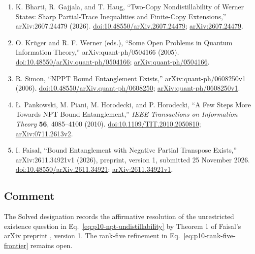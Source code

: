 \begin{enumerate}[label={},leftmargin=4.8em,labelsep=0.5em]
  \item[\textup{[BGH26]}]\label{ref:p10-bharti-et-al}
  K. Bharti, R. Gajjala, and T. Haug,
  ``Two-Copy Nondistillability of Werner States: Sharp Partial-Trace
  Inequalities and Finite-Copy Extensions,'' arXiv:2607.24479 (2026).
  \href{https://doi.org/10.48550/arXiv.2607.24479}{doi:10.48550/arXiv.2607.24479};
  \href{https://arxiv.org/abs/2607.24479}{arXiv:2607.24479}.

  \item[\textup{[KW05]}]\label{ref:p10-krueger-werner}
  O. Kr\"uger and R. F. Werner (eds.),
  ``Some Open Problems in Quantum Information Theory,''
  arXiv:quant-ph/0504166 (2005).
  \href{https://doi.org/10.48550/arXiv.quant-ph/0504166}{doi:10.48550/arXiv.quant-ph/0504166};
  \href{https://arxiv.org/abs/quant-ph/0504166}{arXiv:quant-ph/0504166}.

  \item[\textup{[Sim06]}]\label{ref:p10-simon}
  R. Simon,
  “NPPT Bound Entanglement Exists,” arXiv:quant-ph/0608250v1 (2006).
  \href{https://doi.org/10.48550/arXiv.quant-ph/0608250}{doi:10.48550/arXiv.quant-ph/0608250};
  \href{https://arxiv.org/abs/quant-ph/0608250v1}{arXiv:quant-ph/0608250v1}.

  \item[\textup{[PPH+10]}]\label{ref:p10-pankowski}
  \L. Pankowski, M. Piani, M. Horodecki, and P. Horodecki,
  “A Few Steps More Towards NPT Bound Entanglement,”
  \emph{IEEE Transactions on Information Theory} \textbf{56}, 4085--4100 (2010).
  \href{https://doi.org/10.1109/TIT.2010.2050810}{doi:10.1109/TIT.2010.2050810};
  \href{https://arxiv.org/abs/0711.2613v2}{arXiv:0711.2613v2}.

  \item[\textup{[Fai26]}]\label{ref:p10-faisal}
  I. Faisal,
  “Bound Entanglement with Negative Partial Transpose Exists,”
  arXiv:2611.34921v1 (2026), preprint, version 1, submitted 25 November 2026.
  \href{https://doi.org/10.48550/arXiv.2611.34921}{doi:10.48550/arXiv.2611.34921};
  \href{https://arxiv.org/abs/2611.34921v1}{arXiv:2611.34921v1}.
\end{enumerate}

\subsection*{Comment}

The Solved designation records the affirmative resolution of the
unrestricted existence question in Eq.~\eqref{eq:p10-npt-undistillability}
by Theorem 1 of Faisal's arXiv preprint
, version 1.
The rank-five refinement in Eq.~\eqref{eq:p10-rank-five-frontier}
remains open.

